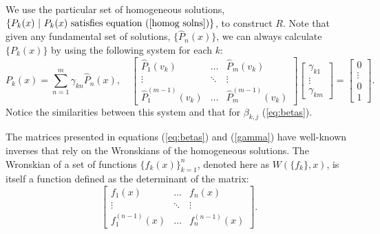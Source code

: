 \documentclass{book}
\begin{document}
We use the particular set of homogeneous solutions, $\{ P_k(x) \ | \ P_k(x) \ \text{satisfies equation} \ (\ref{homog solns}) \}$, to construct $R$.
Note that given any fundamental set of solutions, $\{ \hat{P}_n(x) \}$, we can always calculate $\{ P_k(x) \}$ by using the following system for each $k$:
\begin{equation} \label{gamma}
P_k(x) = \sum_{n=1}^m \gamma_{kn} \hat{P}_n(x), \quad 
\begin{bmatrix} \hat{P}_1(v_k) & \dots & \hat{P}_m(v_k)
\\ \vdots & \ddots & \vdots
\\ \hat{P}_1^{(m-1)}(v_k) & \dots & \hat{P}_m^{(m-1)}(v_k) \end{bmatrix}
\begin{bmatrix} \gamma_{k1} \\ \vdots \\ \gamma_{km} \end{bmatrix} =
\begin{bmatrix} 0 \\ \vdots \\ 0 \\ 1 \end{bmatrix} .
\end{equation}
Notice the similarities between this system and that for $\beta_{k,j}$ (\ref{eq:betas}).

The matrices presented in equations (\ref{eq:betas}) and (\ref{gamma}) have well-known inverses that rely on the Wronskians of the homogeneous solutions.
The Wronskian of a set of functions $\{ f_k(x) \}_{k=1}^n$, denoted here as $W( \{ f_k \}, x)$, is itself a function defined as the determinant of the matrix:
\begin{equation}
\begin{bmatrix} f_1(x) & \dots & f_n(x) \\ \vdots & \ddots & \vdots \\ f^{(n-1)}_1(x) & \dots & f_n^{(n-1)}(x) \end{bmatrix} .
\end{equation}
\end{document}
